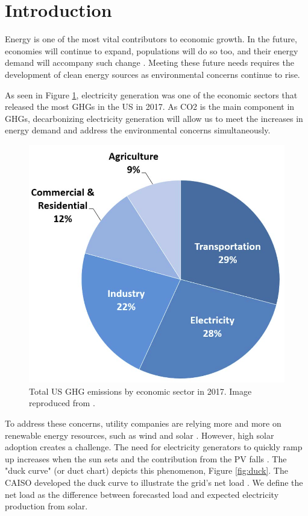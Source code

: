 
\section{Introduction}

Energy is one of the most vital contributors to economic growth.
In the future, economies will continue to expand, populations will do so too, and their energy demand will accompany such change \cite{burke_impact_2018} \cite{el-shafie_hydrogen_2019}.
Meeting these future needs requires the development of clean energy sources as environmental concerns continue to rise.

As seen in Figure \ref{fig:ghg}, electricity generation was one of the economic sectors that released the most \glspl{GHG} in the \gls{US} in 2017.
As \gls{CO2} is the main component in \glspl{GHG}, decarbonizing electricity generation will allow us to meet the increases in energy demand and address the environmental concerns simultaneously.

\begin{figure}[htbp!]
	\centering
	\includegraphics[width=0.4\linewidth]{figures-hydro/total-ghg-2017.png}
	\hfill
	\caption{Total \gls{US} \gls{GHG} emissions by economic sector in 2017. Image reproduced from \cite{us_epa_sources_2020}.}
	\label{fig:ghg}
\end{figure}

To address these concerns, utility companies are relying more and more on renewable energy resources, such as wind and solar \cite{ming_resource_2019}.
However, high solar adoption creates a challenge.
The need for electricity generators to quickly ramp up increases when the sun sets and the contribution from the \gls{PV} falls \cite{us_department_of_energy_confronting_2017}.
The "duck curve" (or duct chart) depicts this phenomenon, Figure \ref{fig:duck}.
The \gls{CAISO} developed the duck curve to illustrate the grid's net load \cite{bouillon_prepared_2014}.
We define the net load as the difference between forecasted load and expected electricity production from solar.

